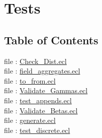 \chapter*{Tests}
\hypertarget{ecldoc:toc:ML_Core/Tests}{}


\section*{Table of Contents}
file : \hyperlink{ecldoc:toc:ML_Core.Tests.Check_Dist}{Check\_Dist.ecl}   \\
file : \hyperlink{ecldoc:toc:ML_Core.Tests.field_aggregates}{field\_aggregates.ecl}   \\
file : \hyperlink{ecldoc:toc:ML_Core.Tests.to_from}{to\_from.ecl}   \\
file : \hyperlink{ecldoc:toc:ML_Core.Tests.Validate_Gammas}{Validate\_Gammas.ecl}   \\
file : \hyperlink{ecldoc:toc:ML_Core.Tests.test_appends}{test\_appends.ecl}   \\
file : \hyperlink{ecldoc:toc:ML_Core.Tests.Validate_Betas}{Validate\_Betas.ecl}   \\
file : \hyperlink{ecldoc:toc:ML_Core.Tests.generate}{generate.ecl}   \\
file : \hyperlink{ecldoc:toc:ML_Core.Tests.test_discrete}{test\_discrete.ecl}   \\









